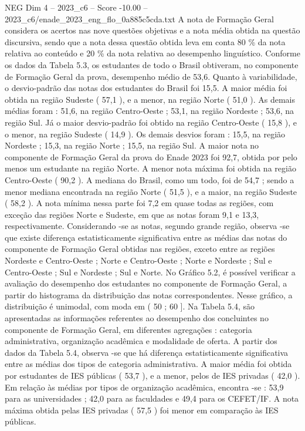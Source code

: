 \begin{textsample}{NEG Dim 4 – 2023\_c6 – Score -10.00 – 2023\_c6/enade\_2023\_eng\_flo\_0a885c5cda.txt}
A nota de Formação Geral considera os acertos nas nove questões objetivas e a nota média obtida na questão discursiva, sendo que a nota dessa questão obtida leva em conta 80 \% da nota relativa ao conteúdo e 20 \% da nota relativa ao desempenho linguístico.
Conforme os dados da Tabela 5.3, os estudantes de todo o Brasil obtiveram, no componente de Formação Geral da prova, desempenho médio de 53,6.
Quanto à variabilidade, o desvio-padrão das notas dos estudantes do Brasil foi 15,5.
A maior média foi obtida na região Sudeste ( 57,1 ), e a menor, na região Norte ( 51,0 ).
As demais médias foram : 51,6, na região Centro-Oeste ; 53,1, na região Nordeste ; 53,6, na região Sul.
Já o maior desvio-padrão foi obtido na região Centro-Oeste ( 15,8 ), e o menor, na região Sudeste ( 14,9 ).
Os demais desvios foram : 15,5, na região Nordeste ; 15,3, na região Norte ; 15,5, na região Sul.
A maior nota no componente de Formação Geral da prova do Enade 2023 foi 92,7, obtida por pelo menos um estudante na região Norte.
A menor nota máxima foi obtida na região Centro-Oeste ( 90,2 ).
A mediana do Brasil, como um todo, foi de 54,7 ; sendo a menor mediana encontrada na região Norte ( 51,5 ), e a maior, na região Sudeste ( 58,2 ).
A nota mínima nessa parte foi 7,2 em quase todas as regiões, com exceção das regiões Norte e Sudeste, em que as notas foram 9,1 e 13,3, respectivamente.
Considerando -se as notas, segundo grande região, observa -se que existe diferença estatisticamente significativa entre as médias das notas do componente de Formação Geral obtidas nas regiões, exceto entre as regiões Nordeste e Centro-Oeste ; Norte e Centro-Oeste ; Norte e Nordeste ; Sul e Centro-Oeste ; Sul e Nordeste ; Sul e Norte.
No Gráfico 5.2, é possível verificar a avaliação do desempenho dos estudantes no componente de Formação Geral, a partir do histograma da distribuição das notas correspondentes.
Nesse gráfico, a distribuição é unimodal, com moda em ( 50 ; 60 ].
Na Tabela 5.4, são apresentadas as informações referentes ao desempenho dos concluintes no componente de Formação Geral, em diferentes agregações : categoria administrativa, organização acadêmica e modalidade de oferta.
A partir dos dados da Tabela 5.4, observa -se que há diferença estatisticamente significativa entre as médias dos tipos de categoria administrativa.
A maior média foi obtida por estudantes de IES públicas ( 53,7 ), e a menor, pelos de IES privadas ( 42,0 ).
Em relação às médias por tipos de organização acadêmica, encontra -se : 53,9 para as universidades ; 42,0 para as faculdades e 49,4 para os CEFET/IF.
A nota máxima obtida pelas IES privadas ( 57,5 ) foi menor em comparação às IES públicas.

\end{textsample}
